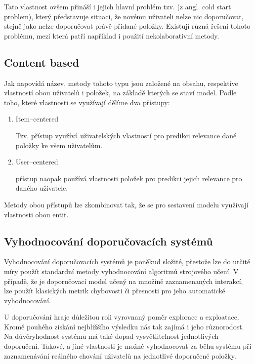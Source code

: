 \documentclass[thesis=M,czech]{FITthesis}[2019/12/23]
\begin{document}
Tato vlastnost ovšem přináší i jejich hlavní problém tzv.  (z angl. cold start problem), který představuje situaci, že novému uživateli nelze nic doporučovat, stejně jako nelze doporučovat právě přidané položky. Existují různá řešení tohoto problému, mezi která patří například i použití nekolaborativní metody.

\subsection{Content based}
\label{sec:contentbased}

Jak napovídá název, metody tohoto typu jsou založené na obsahu, respektive vlastností obou uživatelů i položek, na základě kterých se staví model. Podle toho, které vlastnosti se využívají dělíme dva přístupy:
\begin{enumerate}
    \item Item--centered
    
    Tzv.  přístup využívá uživatelských vlastností pro predikci relevance dané položky ke všem uživatelům.
    
    \item User--centered
    
     přístup naopak používá vlastnosti položek pro predikci jejich relevance pro daného uživatele.
    
\end{enumerate}

Metody obou přístupů lze zkombinovat tak, že se pro sestavení modelu využívají vlastnosti obou entit.

\subsection{Vyhodnocování doporučovacích systémů}
\label{sec:recommender_evaluation}

Vyhodnocování doporučovacích systémů je poněkud složité, přestože lze do určité míry použít standardní metody vyhodnocování algoritmů strojového učení. V případě, že je doporučovací model učený na množině zaznamenaných interakcí, lze použít klasických metrik chybovosti či přesnosti pro jeho automatické vyhodnocování.

U doporučování hraje důležitou roli vyrovnaný poměr explorace a exploatace. Kromě pouhého získání nejbližšího výsledku nás tak zajímá i jeho různorodost. Na důvěryhodnost systému má také dopad vysvětlitelnost jednotlivých doporučení. Takové, a jiné vlastnosti je možné vyhodnocovat za běhu systému při zaznamenávání reálného chování uživatelů na jednotlivé doporučené položky.
\newpage
\end{document}
